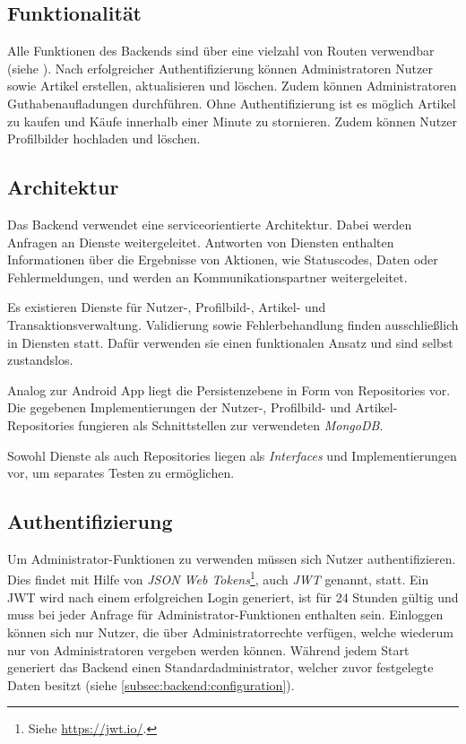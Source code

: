 \documentclass[a4paper, 11pt]{article}
\begin{document}
\subsection{Funktionalität}
\label{subsec:backend:functionality}
Alle Funktionen des Backends sind über eine vielzahl von Routen verwendbar (siehe ).
Nach erfolgreicher Authentifizierung können Administratoren Nutzer sowie Artikel erstellen, aktualisieren und löschen.
Zudem können Administratoren Guthabenaufladungen durchführen.
Ohne Authentifizierung ist es möglich Artikel zu kaufen und Käufe innerhalb einer Minute zu stornieren.
Zudem können Nutzer Profilbilder hochladen und löschen.

\subsection{Architektur}
\label{subsec:backend:architecture}
Das Backend verwendet eine serviceorientierte Architektur.
Dabei werden Anfragen an Dienste weitergeleitet.
Antworten von Diensten enthalten Informationen über die Ergebnisse von Aktionen, wie Statuscodes, Daten oder Fehlermeldungen, und werden an Kommunikationspartner weitergeleitet.

Es existieren Dienste für Nutzer-, Profilbild-, Artikel- und Transaktionsverwaltung.
Validierung sowie Fehlerbehandlung finden ausschließlich in Diensten statt.
Dafür verwenden sie einen funktionalen Ansatz und sind selbst zustandslos.

Analog zur Android App liegt die Persistenzebene in Form von Repositories vor.
Die gegebenen Implementierungen der Nutzer-, Profilbild- und Artikel-Repositories fungieren als Schnittstellen zur verwendeten \textit{MongoDB}.

Sowohl Dienste als auch Repositories liegen als \textit{Interfaces} und Implementierungen vor, um separates Testen zu ermöglichen.

\subsection{Authentifizierung}
\label{subsec:backend:authentication}
Um Administrator-Funktionen zu verwenden müssen sich Nutzer authentifizieren.
Dies findet mit Hilfe von \textit{JSON Web Tokens}\footnote{Siehe \url{https://jwt.io/}.}, auch \textit{JWT} genannt, statt.
Ein JWT wird nach einem erfolgreichen Login generiert, ist für 24 Stunden gültig und muss bei jeder Anfrage für Administrator-Funktionen enthalten sein.
Einloggen können sich nur Nutzer, die über Administratorrechte verfügen, welche wiederum nur von Administratoren vergeben werden können.
Während jedem Start generiert das Backend einen Standard\-administrator, welcher zuvor festgelegte Daten besitzt (siehe \autoref{subsec:backend:configuration}).
\end{document}

